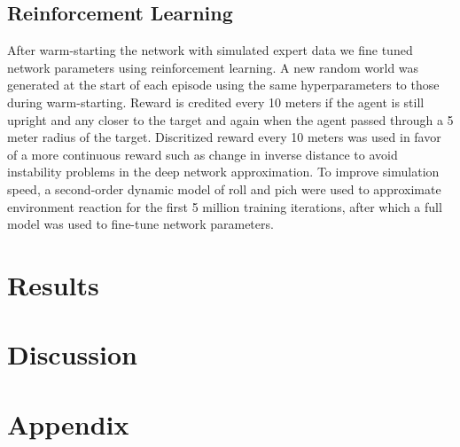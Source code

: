 \documentclass[paper=a4, fontsize=11pt]{scrartcl} %
\begin{document}
	\subsection{Reinforcement Learning} 
	After warm-starting the network with simulated expert data we fine tuned network parameters using reinforcement learning. A new random world was generated at the start of each episode using the same hyperparameters to those during warm-starting. Reward is credited every 10 meters if the agent is still upright and any closer to the target and again when the agent passed through a 5 meter radius of the target. Discritized reward every 10 meters was used in favor of a more continuous reward such as change in inverse distance to avoid instability problems in the deep network approximation. To improve simulation speed, a second-order dynamic model of roll and pich were used to approximate environment reaction for the first 5 million training iterations, after which a full model was used to fine-tune network parameters.


\section{Results}

\section{Discussion}


\section{Appendix}




\end{document}
